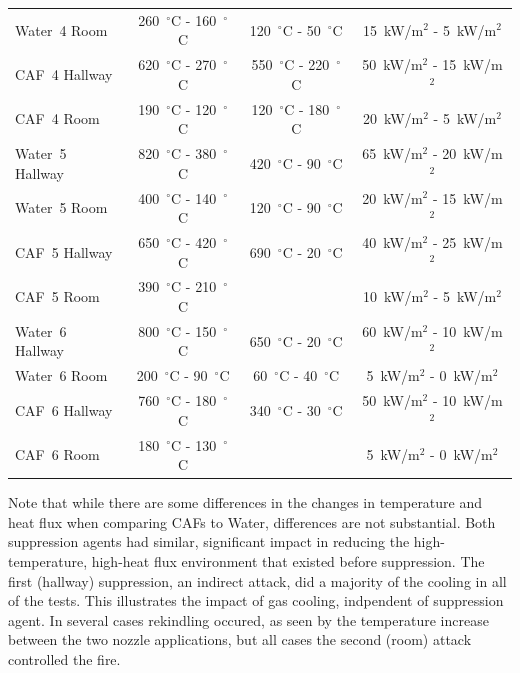 \documentclass[12pt,oneside]{book}
\begin{document}
\begin{table}[!ht]
\begin{tabular}{lccc}
Water~4 Room     & 260~$^{\circ}$C - 160~$^{\circ}$C   & 120~$^{\circ}$C - 50~$^{\circ}$C    & 15~kW/m$^2$ - 5~kW/m$^2$  \\ [.25cm]
CAF~4 Hallway    & 620~$^{\circ}$C - 270~$^{\circ}$C   & 550~$^{\circ}$C - 220~$^{\circ}$C   & 50~kW/m$^2$ - 15~kW/m$^2$  \\
CAF~4 Room       & 190~$^{\circ}$C - 120~$^{\circ}$C   & 120~$^{\circ}$C - 180~$^{\circ}$C   & 20~kW/m$^2$ - 5~kW/m$^2$  \\ [.25cm]
Water~5 Hallway  & 820~$^{\circ}$C - 380~$^{\circ}$C   & 420~$^{\circ}$C - 90~$^{\circ}$C    & 65~kW/m$^2$ - 20~kW/m$^2$  \\
Water~5 Room     & 400~$^{\circ}$C - 140~$^{\circ}$C   & 120~$^{\circ}$C - 90~$^{\circ}$C    & 20~kW/m$^2$ - 15~kW/m$^2$  \\ [.25cm]
CAF~5 Hallway    & 650~$^{\circ}$C - 420~$^{\circ}$C   & 690~$^{\circ}$C - 20~$^{\circ}$C    & 40~kW/m$^2$ - 25~kW/m$^2$  \\
CAF~5 Room       & 390~$^{\circ}$C - 210~$^{\circ}$C   &                                     & 10~kW/m$^2$ - 5~kW/m$^2$  \\ [.25cm]
Water~6 Hallway  & 800~$^{\circ}$C - 150~$^{\circ}$C   & 650~$^{\circ}$C - 20~$^{\circ}$C    & 60~kW/m$^2$ - 10~kW/m$^2$  \\
Water~6 Room     & 200~$^{\circ}$C - 90~$^{\circ}$C    & 60~$^{\circ}$C - 40~$^{\circ}$C     & 5~kW/m$^2$ - 0~kW/m$^2$  \\ [.25cm]
CAF~6 Hallway    & 760~$^{\circ}$C - 180~$^{\circ}$C   & 340~$^{\circ}$C - 30~$^{\circ}$C    & 50~kW/m$^2$ - 10~kW/m$^2$  \\
CAF~6 Room       & 180~$^{\circ}$C - 130~$^{\circ}$C   &                                     & 5~kW/m$^2$ - 0~kW/m$^2$  \\ [.25cm]
\bottomrule[1.25pt]
\end{tabular}\par
\end{table}

Note that while there are some differences in the changes in temperature and heat flux when comparing CAFs to Water, differences are not substantial. Both suppression agents had similar, significant impact in reducing the high-temperature, high-heat flux environment that existed before suppression. The first (hallway) suppression, an indirect attack, did a majority of the cooling in all of the tests. This illustrates the impact of gas cooling, indpendent of suppression agent. In several cases rekindling occured, as seen by the temperature increase between the two nozzle applications, but all cases the second (room) attack controlled the fire.
\end{document}
